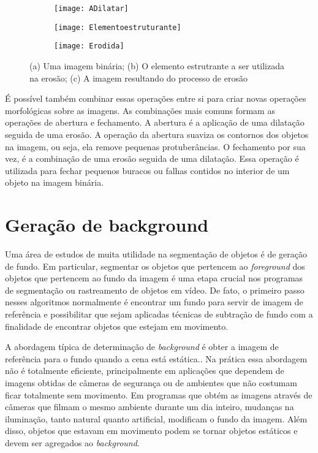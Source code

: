       \begin{figure}
 \centering
\begin{subfigure}{.5\textwidth}
  \centering
  \texttt{[image: ADilatar]}
  \caption{}
  \label{Erosao:sfig1}
\end{subfigure}%
\begin{subfigure}{.5\textwidth}
  \centering
  \texttt{[image: Elementoestruturante]}
  \caption{}
  \label{Erosao:sfig2}
\end{subfigure}


\begin{subfigure}{.5\textwidth}
  \centering
  \texttt{[image: Erodida]}
  \caption{}
  \label{Erosao:sfig3}
\end{subfigure}
\caption{(a) Uma imagem binária; (b) O elemento estrutrante a ser utilizada na erosão; (c) A imagem resultando do processo de erosão}
\label{ErosaoFig}
\end{figure}

    É possível também combinar essas operações entre si para criar novas operações morfológicas sobre as imagens. As combinações mais comuns formam as operações de abertura e fechamento. A abertura é a aplicação de uma dilatação seguida de uma erosão. A operação da abertura suaviza os contornos dos objetos na imagem, ou seja, ela remove pequenas protuberâncias. O fechamento por sua vez, é a combinação de uma erosão seguida de uma dilatação. Essa operação é utilizada para fechar pequenos buracos ou falhas contidos no interior de um objeto na imagem binária.


   \section{Geração de background} \label{background}

   Uma área de estudos de muita utilidade na segmentação de objetos é de geração de fundo. Em particular, segmentar os objetos que pertencem ao \textit{foreground} dos objetos que pertencem ao fundo da imagem é uma etapa crucial nos programas de segmentação ou rastreamento de objetos em vídeo. De fato, o primeiro passo nesses algoritmos normalmente é encontrar um fundo para servir de imagem de referência e possibilitar que sejam aplicadas técnicas de subtração de fundo com a finalidade de encontrar objetos que estejam em movimento.

   A abordagem típica de determinação de \textit{background} é obter a imagem de referência para o fundo quando a cena está estática.\cite{shoushtarian2003practical}. Na prática essa abordagem não é totalmente eficiente, principalmente em aplicações que dependem de imagens obtidas de câmeras de segurança ou de ambientes que não costumam ficar totalmente sem movimento. Em programas que obtém as imagens através de câmeras que filmam o mesmo ambiente durante um dia inteiro, mudanças na iluminação, tanto natural quanto artificial, modificam o fundo da imagem. Além disso, objetos que estavam em movimento podem se tornar objetos estáticos e devem ser agregados ao \textit{background}.

